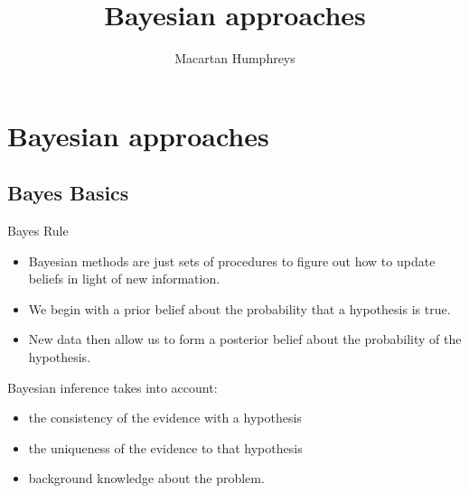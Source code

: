 \documentclass[
  11pt,
  ignorenonframetext,
]{beamer}
\title{Bayesian approaches}
\author{Macartan Humphreys}
\date{}
\providecommand{\tightlist}{%
  \setlength{\itemsep}{0pt}\setlength{\parskip}{0pt}}\usepackage{longtable,booktabs,array}
\begin{document}
\frame{\titlepage}
\ifdefined\Shaded\renewenvironment{Shaded}{\begin{tcolorbox}[frame hidden, interior hidden, sharp corners, enhanced, breakable, borderline west={3pt}{0pt}{shadecolor}, boxrule=0pt]}{\end{tcolorbox}}\fi

\hypertarget{bayesian-approaches}{%
\section{Bayesian approaches}\label{bayesian-approaches}}

\hypertarget{bayes-basics}{%
\subsection{Bayes Basics}\label{bayes-basics}}

\begin{frame}{Bayes Rule}
\protect\hypertarget{bayes-rule}{}
\begin{itemize}
\item
  Bayesian methods are just sets of procedures to figure out how to
  update beliefs in light of new information.
\item
  We begin with a prior belief about the probability that a hypothesis
  is true.
\item
  New data then allow us to form a posterior belief about the
  probability of the hypothesis.
\end{itemize}

Bayesian inference takes into account:

\begin{itemize}
\tightlist
\item
  the consistency of the evidence with a hypothesis
\item
  the uniqueness of the evidence to that hypothesis
\item
  background knowledge about the problem.
\end{itemize}
\end{frame}
\end{document}
